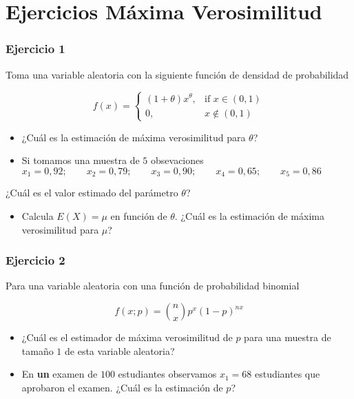 \documentclass[
]{book}
\providecommand{\tightlist}{%
  \setlength{\itemsep}{0pt}\setlength{\parskip}{0pt}}
\begin{document}
\hypertarget{ejercicios-muxe1xima-verosimilitud}{%
\section{Ejercicios Máxima Verosimilitud}\label{ejercicios-muxe1xima-verosimilitud}}

\hypertarget{ejercicio-1-9}{%
\subsubsection{Ejercicio 1}\label{ejercicio-1-9}}

Toma una variable aleatoria con la siguiente función de densidad de probabilidad

\[
f(x)=
\begin{cases}
    (1+\theta)x^\theta,& \text{if } x\in (0,1)\\
    0,&  x\notin (0,1)
\end{cases}
\]

\begin{itemize}
\item
  ¿Cuál es la estimación de máxima verosimilitud para \(\theta\)?
\item
  Si tomamos una muestra de \(5\) obsevaciones
  \(x_1 = 0,92; \qquad x_2 = 0,79; \qquad x_3 = 0,90; \qquad x_4 = 0,65; \qquad x_5 = 0,86\)
\end{itemize}

¿Cuál es el valor estimado del parámetro \(\theta\)?

\begin{itemize}
\tightlist
\item
  Calcula \(E(X)=\mu\) en función de \(\theta\). ¿Cuál es la estimación de máxima verosimilitud para \(\mu\)?
\end{itemize}

\hypertarget{ejercicio-2-9}{%
\subsubsection{Ejercicio 2}\label{ejercicio-2-9}}

Para una variable aleatoria con una función de probabilidad binomial

\[f(x; p)=\binom nxp^x(1-p)^{nx}\]

\begin{itemize}
\item
  ¿Cuál es el estimador de máxima verosimilitud de \(p\) para una muestra de tamaño \(1\) de esta variable aleatoria?
\item
  En \textbf{un} examen de \(100\) estudiantes observamos \(x_1=68\) estudiantes que aprobaron el examen. ¿Cuál es la estimación de \(p\)?
\end{itemize}
\end{document}
